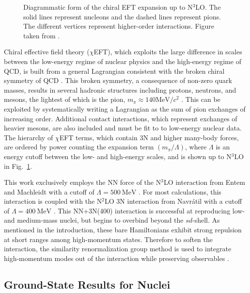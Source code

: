 \documentclass[thesis.tex]{subfiles}
\begin{document}
\begin{figure}[h]
  \centering
  \caption{Diagrammatic form of the chiral EFT expansion up to N$^{3}$LO.  The solid lines represent nucleons and the dashed lines represent pions.  The different vertices represent higher-order interactions.  Figure taken from  \cite{MACHLEIDT2016}.}  
  \label{fig:Chiral_Forces}
\end{figure}

Chiral effective field theory ($\chi$EFT), which exploits the large difference in scales between the low-energy regime of nuclear physics and the high-energy regime of QCD, is built from a general Lagrangian consistent with the broken chiral symmetry of QCD \cite{EPELBAUM20091773,MACHLEIDT2016}.  This broken symmetry, a consequence of non-zero quark masses, results in several hadronic structures including protons, neutrons, and mesons, the lightest of which is the pion, $m_{\pi}\approx 140\mathrm{MeV}/c^{2}$ \cite{BERINGER2012}.  This can be exploited by systematically writing a Lagrangian as the sum of pion exchanges of increasing order.  Additional contact interactions, which represent exchanges of heavier mesons, are also included and must be fit to to low-energy nuclear data.  The hierarchy of $\chi$EFT terms, which contain 3N and higher many-body forces, are ordered by power counting the expansion term $(m_{\pi}/\Lambda)$, where $\Lambda$ is an energy cutoff between the low- and high-energy scales, and is shown up to N$^{3}$LO in Fig.\ \ref{fig:Chiral_Forces}.

This work exclusively employs the NN force of the N$^{3}$LO interaction from Entem and Machleidt with a cutoff of $\Lambda=500\ \mathrm{MeV}$ \cite{ENTEM2003}.  For most calculations, this interaction is coupled with the N$^{2}$LO 3N interaction from Navr\'{a}til with a cutoff of $\Lambda=400\ \mathrm{MeV}$ \cite{NAVRATIL2007}.  This NN+3N(400) interaction is successful at reproducing low- and medium-mass nuclei, but begins to overbind beyond the $sd$-shell.  As mentioned in the introduction, these bare Hamiltonians exhibit strong repulsion at short ranges among high-momentum states.  Therefore to soften the interaction, the similarity renormalization group method is used to integrate high-momentum modes out of the interaction while preserving observables \cite{BOGNER201094,ROTH2011072501}.


\subsection{Ground-State Results for Nuclei} \label{section:nuclear_results}
\end{document}
